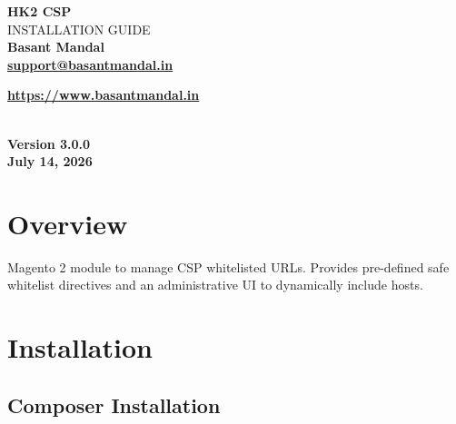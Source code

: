\documentclass[11pt,a4paper]{article}
\begin{document}
\begin{titlepage}
\centering

\vspace*{4cm}

{\Huge\bfseries HK2 CSP}\\[0.6cm]

{\Large INSTALLATION GUIDE}\\[2.5cm]

{\Large \textbf{Basant Mandal}}\\[0.9cm]

\href{mailto:support@basantmandal.in}{\textbf{support@basantmandal.in}}

\vspace{0.3cm}

\href{https://www.basantmandal.in}{\textbf{https://www.basantmandal.in}}

\\[5cm]

{\textbf{Version 3.0.0}}\\[0.3cm]

{\textbf{July 14, 2026}}\\[4cm]

\vfill

\end{titlepage}

\tableofcontents
\newpage

\section{Overview}

Magento 2 module to manage CSP whitelisted URLs. Provides pre-defined safe whitelist directives and an administrative UI to dynamically include hosts.

\section{Installation}

\subsection{Composer Installation}
\end{document}
